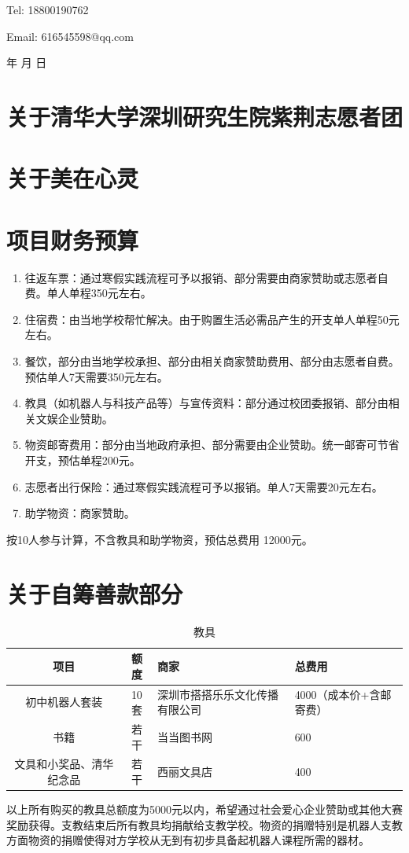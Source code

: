 \documentclass[12pt]{ctexart}
\begin{document}
Tel: 18800190762

Email: 616545598@qq.com

\begin{flushright}
\the\year 年 \the\month 月 \the\day 日
\end{flushright}

\begin{appendix}

\section{关于清华大学深圳研究生院紫荆志愿者团}

\section{关于美在心灵}

\section{项目财务预算}\label{scheduling}


\begin{enumerate}
\item 往返车票：通过寒假实践流程可予以报销、部分需要由商家赞助或志愿者自费。单人单程350元左右。
\item 住宿费：由当地学校帮忙解决。由于购置生活必需品产生的开支单人单程50元左右。
\item 餐饮，部分由当地学校承担、部分由相关商家赞助费用、部分由志愿者自费。预估单人7天需要350元左右。
\item 教具（如机器人与科技产品等）与宣传资料：部分通过校团委报销、部分由相关文娱企业赞助。
\item 物资邮寄费用：部分由当地政府承担、部分需要由企业赞助。统一邮寄可节省开支，预估单程200元。
\item 志愿者出行保险：通过寒假实践流程可予以报销。单人7天需要20元左右。
\item 助学物资：商家赞助。
\end{enumerate}
按10人参与计算，不含教具和助学物资，预估总费用 12000元。
\section{关于自筹善款部分}
\begin{table}[!ht]
\centering
\begin{tabular}{|c|c|p{3cm}|p{2cm}|}
\hline
项目 & 额度 & 商家  & 总费用 \\
\hline
初中机器人套装 &  10套 & 深圳市搭搭乐乐文化传播有限公司 & 4000（成本价+含邮寄费） \\
\hline
书籍 & 若干 &  当当图书网 & 600 \\
\hline
文具和小奖品、清华纪念品 & 若干 & 西丽文具店 & 400 \\
\hline
\end{tabular}
\caption{教具}
\end{table}
以上所有购买的教具总额度为5000元以内，希望通过社会爱心企业赞助或其他大赛奖励获得。支教结束后所有教具均捐献给支教学校。物资的捐赠特别是机器人支教方面物资的捐赠使得对方学校从无到有初步具备起机器人课程所需的器材。

\end{appendix}
\end{document}
